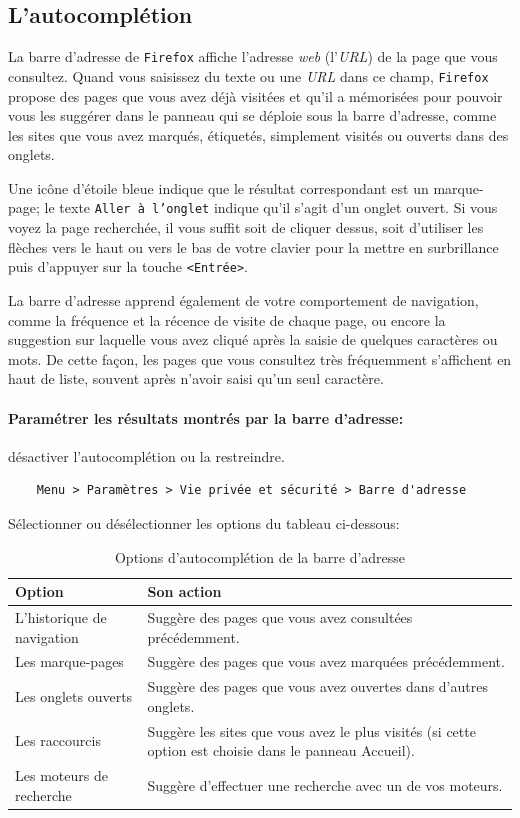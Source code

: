 \documentclass[a4paper,11pt]{book}
\begin{document}
\subsection*{L'autocomplétion}
La barre d’adresse de \texttt{Firefox} affiche l’adresse \textit{web} (l’\textit{URL}) de la page que vous consultez. Quand vous saisissez du texte ou une \textit{URL} dans ce champ, \texttt{Firefox} propose des pages que vous avez déjà visitées et qu’il a mémorisées pour pouvoir vous les suggérer dans le panneau qui se déploie sous la barre d’adresse, comme les sites que vous avez marqués, étiquetés, simplement visités ou ouverts dans des onglets.
\medskip

Une icône d’étoile bleue indique que le résultat correspondant est un marque-page; le texte \og \texttt{Aller à l’onglet}\fg{} indique qu’il s’agit d’un onglet ouvert. Si vous voyez la page recherchée, il vous suffit soit de cliquer dessus, soit d’utiliser les flèches vers le haut ou vers le bas de votre clavier pour la mettre en surbrillance puis d’appuyer sur la touche \texttt{<Entrée>}.
\medskip

La barre d’adresse apprend également de votre comportement de navigation, comme la fréquence et la récence de visite de chaque page, ou encore la suggestion sur laquelle vous avez cliqué après la saisie de quelques caractères ou mots. De cette façon, les pages que vous consultez très fréquemment s’affichent en haut de liste, souvent après n’avoir saisi qu’un seul caractère.
\medskip

\paragraph{Paramétrer les résultats montrés par la barre d'adresse:} désactiver l'autocomplétion ou la restreindre.
\begin{verbatim}
    Menu > Paramètres > Vie privée et sécurité > Barre d'adresse
\end{verbatim}
\medskip

Sélectionner ou désélectionner les options du tableau ci-dessous:
\begin{table}[!h]
\begin{center}
\begin{tabular}{|p{4.5cm}|p{7cm}|}
\hline
\textbf{Option} & \textbf{Son action} \\
\hline
L’historique de navigation  & Suggère des pages que vous avez consultées précédemment. \\
\hline
Les marque-pages & Suggère des pages que vous avez marquées précédemment. \\
\hline
Les onglets ouverts & Suggère des pages que vous avez ouvertes dans d’autres onglets. \\
\hline
Les raccourcis & Suggère les sites que vous avez le plus visités (si cette option est choisie dans le panneau Accueil). \\
\hline
Les moteurs de recherche & Suggère d’effectuer une recherche avec un de vos moteurs. \\
\hline  
\end{tabular}
\caption{Options d'autocomplétion de la barre d'adresse}
\end{center}
\end{table}
\medskip
\end{document}

